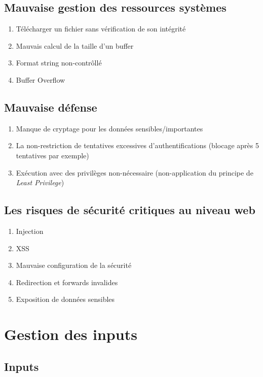 \documentclass{report}
\begin{document}
\subsection{Mauvaise gestion des ressources systèmes}

\begin{enumerate}
    \item Télécharger un fichier sans vérification de son intégrité
    \item Mauvais calcul de la taille d'un buffer
    \item Format string non-contrôllé
    \item Buffer Overflow
\end{enumerate}

\subsection{Mauvaise défense}

\begin{enumerate}
    \item Manque de cryptage pour les données sensibles/importantes
    \item La non-restriction de tentatives excessives d'authentifications (blocage après 5 tentatives par exemple)
    \item Exécution avec des privilèges non-nécessaire (non-application du principe de \textit{Least Privilege})
\end{enumerate}

\subsection{Les risques de sécurité critiques au niveau web}

\begin{enumerate}
    \item Injection
    \item XSS
    \item Mauvaise configuration de la sécurité
    \item Redirection et forwards invalides
    \item Exposition de données sensibles
\end{enumerate}

\section{Gestion des inputs}

\subsection{Inputs}
\end{document}
